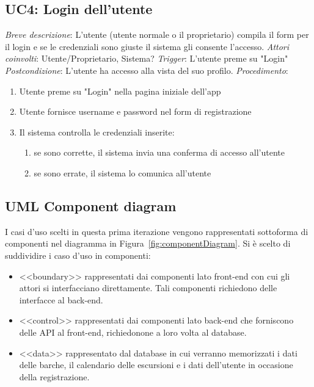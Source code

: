 \subsection{UC4: Login dell'utente}
\noindent \emph{Breve descrizione}: L'utente (utente normale o il proprietario) compila il form per il login e se le credenziali sono giuste il sistema gli consente l'accesso.\medbreak
\noindent \emph{Attori coinvolti}: Utente/Proprietario, Sistema?\medbreak
\noindent \emph{Trigger}: L'utente preme su "Login"\medbreak
\noindent \emph{Postcondizione}: L'utente ha accesso alla vista del suo profilo.\medbreak
\noindent \emph{Procedimento}:
\begin{enumerate}
    \item Utente preme su "Login" nella pagina iniziale dell'app
    \item Utente fornisce username e password nel form di registrazione
    \item Il sistema controlla le credenziali inserite:
          \begin{enumerate}
              \item se sono corrette, il sistema invia una conferma di accesso all'utente
              \item se sono errate, il sistema lo comunica all'utente
          \end{enumerate}
\end{enumerate}

\subsection{UML Component diagram}
I casi d'uso scelti in questa prima iterazione vengono rappresentati sottoforma di componenti nel diagramma in Figura~\ref{fig:componentDiagram}.
Si è scelto di suddividire i caso d'uso in componenti:

\begin{itemize}
    \item <<boundary>> rappresentati dai componenti lato front-end con cui gli attori si interfacciano direttamente. Tali componenti richiedono delle interfacce al back-end.
    \item <<control>> rappresentati dai componenti lato back-end che forniscono delle API al front-end, richiedonone a loro volta al database.
    \item <<data>> rappresentato dal database in cui verranno memorizzati i dati delle barche, il calendario delle escursioni e i dati dell'utente in occasione della registrazione.
\end{itemize}

